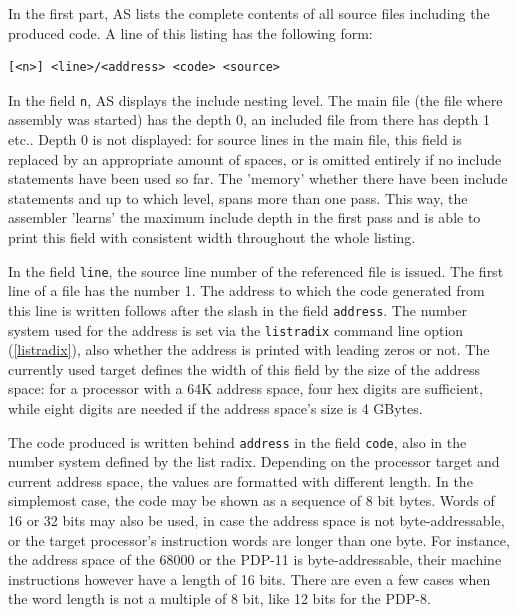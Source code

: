 \documentclass[12pt,twoside]{report}
\newcommand{\tty}[1]{{\tt #1}}
\newcommand{\asname}{{AS}}
\begin{document}
In the first part, \asname{} lists the complete contents of all source files
including the produced code.  A line of this listing has the following
form:
\begin{verbatim}
[<n>] <line>/<address> <code> <source>
\end{verbatim}
In the field \tty{n}, \asname{} displays the include nesting level.  The main file
(the file where assembly was started) has the depth 0, an included
file from there has depth 1 etc..  Depth 0 is not displayed: for source lines
in the main file, this field is replaced by an appropriate amount of spaces,
or is omitted entirely if no include statements have been used so far.  The
'memory' whether there have been include statements and up to which level,
spans more than one pass.  This way, the assembler 'learns' the maximum
include depth in the first pass and is able to print this field with
consistent width throughout the whole listing.

In the field \tty{line}, the source line number of the referenced file is
issued. The first line of a file has the number 1.  The address to
which the code generated from this line is written follows after the
slash in the field \tty{address}.  The number system used for the address
is set via the {\tt listradix} command line option (\ref{listradix}), also
whether the address is printed with leading zeros or not.  The currently
used target defines the width of this field by the size of the address
space: for a processor with a 64K address space, four hex digits are
sufficient, while eight digits are needed if the address space's size
is 4 GBytes.

The code produced is written behind \tty{address} in the field \tty{code},
also in the number system defined by the list radix.  Depending on the
processor target and current address space, the values are formatted with
different length.  In the simplemost case, the code may be shown as a
sequence of 8 bit bytes.  Words of 16 or 32 bits may also be used, in
case the address space is not byte-addressable, or the target processor's
instruction words are longer than one byte.  For instance, the address
space of the 68000 or the PDP-11 is byte-addressable, their machine instructions
however have a length of 16 bits.  There are even a few cases when the
word length is not a multiple of 8 bit, like 12 bits for the PDP-8.
\end{document}
